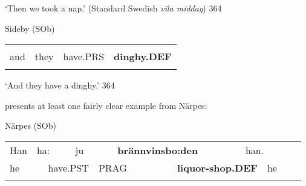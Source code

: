 \begin{styleTranslation}
‘Then we took a nap.’ (Standard Swedish \textit{vila middag}) 364

\end{styleTranslation}

\begin{listWWNumileveli}
\item {}

\begin{styleExample}
Sideby (SOb)

\end{styleExample}

\end{listWWNumileveli}

\begin{tabular}{llll}
\lsptoprule
\multicolumn{4}{l}{Å

}\\
and & they & have.PRS & {\bfseries dinghy.DEF}\\
\lspbottomrule
\end{tabular}

\begin{styleTranslation}
‘And they have a dinghy.’ 364

\end{styleTranslation}

\begin{styleBodyTextFirst}
\citet{Ivars2005} presents at least one fairly clear example from Närpes:

\end{styleBodyTextFirst}

\begin{listWWNumileveli}
\item {}

\begin{styleExample}
Närpes (SOb)

\end{styleExample}

\end{listWWNumileveli}

\begin{tabular}{llllllllllll}
\lsptoprule
Han & \multicolumn{2}{l}{ha:

} & \multicolumn{2}{l}{ju

} & \multicolumn{2}{l}{{\bfseries brännvinsbo:den}

} & \multicolumn{2}{l}{han.

} & \multicolumn{2}{l}{} & \\
\multicolumn{2}{l}{he

} & \multicolumn{2}{l}{have.PST

} & \multicolumn{2}{l}{PRAG

} & \multicolumn{2}{l}{{\bfseries liquor-shop.DEF}

} & \multicolumn{2}{l}{he

} & \multicolumn{2}{l}{}\\
\lspbottomrule
\end{tabular}

